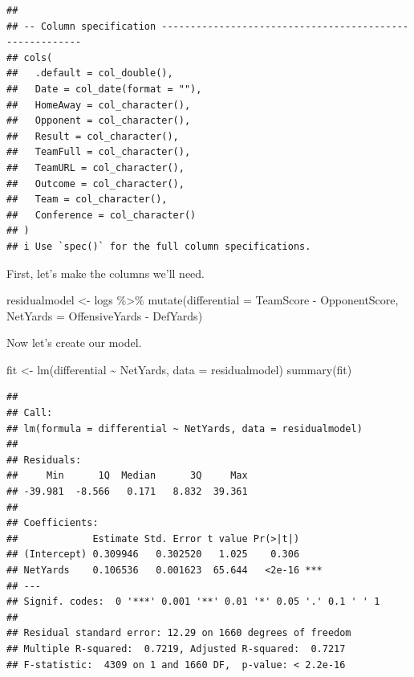 \documentclass[
]{book}
\newenvironment{Shaded}{\begin{snugshade}}{\end{snugshade}}
\newcommand{\AttributeTok}[1]{\textcolor[rgb]{0.77,0.63,0.00}{#1}}
\newcommand{\FunctionTok}[1]{\textcolor[rgb]{0.00,0.00,0.00}{#1}}
\newcommand{\NormalTok}[1]{#1}
\newcommand{\OtherTok}[1]{\textcolor[rgb]{0.56,0.35,0.01}{#1}}
\newcommand{\SpecialCharTok}[1]{\textcolor[rgb]{0.00,0.00,0.00}{#1}}
\begin{document}
\begin{verbatim}
## 
## -- Column specification --------------------------------------------------------
## cols(
##   .default = col_double(),
##   Date = col_date(format = ""),
##   HomeAway = col_character(),
##   Opponent = col_character(),
##   Result = col_character(),
##   TeamFull = col_character(),
##   TeamURL = col_character(),
##   Outcome = col_character(),
##   Team = col_character(),
##   Conference = col_character()
## )
## i Use `spec()` for the full column specifications.
\end{verbatim}

First, let's make the columns we'll need.

\begin{Shaded}
\begin{Highlighting}[]
\NormalTok{residualmodel }\OtherTok{\textless{}{-}}\NormalTok{ logs }\SpecialCharTok{\%\textgreater{}\%} \FunctionTok{mutate}\NormalTok{(}\AttributeTok{differential =}\NormalTok{ TeamScore }\SpecialCharTok{{-}}\NormalTok{ OpponentScore, }\AttributeTok{NetYards =}\NormalTok{ OffensiveYards }\SpecialCharTok{{-}}\NormalTok{ DefYards)}
\end{Highlighting}
\end{Shaded}

Now let's create our model.

\begin{Shaded}
\begin{Highlighting}[]
\NormalTok{fit }\OtherTok{\textless{}{-}} \FunctionTok{lm}\NormalTok{(differential }\SpecialCharTok{\textasciitilde{}}\NormalTok{ NetYards, }\AttributeTok{data =}\NormalTok{ residualmodel)}
\FunctionTok{summary}\NormalTok{(fit)}
\end{Highlighting}
\end{Shaded}

\begin{verbatim}
## 
## Call:
## lm(formula = differential ~ NetYards, data = residualmodel)
## 
## Residuals:
##     Min      1Q  Median      3Q     Max 
## -39.981  -8.566   0.171   8.832  39.361 
## 
## Coefficients:
##             Estimate Std. Error t value Pr(>|t|)    
## (Intercept) 0.309946   0.302520   1.025    0.306    
## NetYards    0.106536   0.001623  65.644   <2e-16 ***
## ---
## Signif. codes:  0 '***' 0.001 '**' 0.01 '*' 0.05 '.' 0.1 ' ' 1
## 
## Residual standard error: 12.29 on 1660 degrees of freedom
## Multiple R-squared:  0.7219, Adjusted R-squared:  0.7217 
## F-statistic:  4309 on 1 and 1660 DF,  p-value: < 2.2e-16
\end{verbatim}
\end{document}
